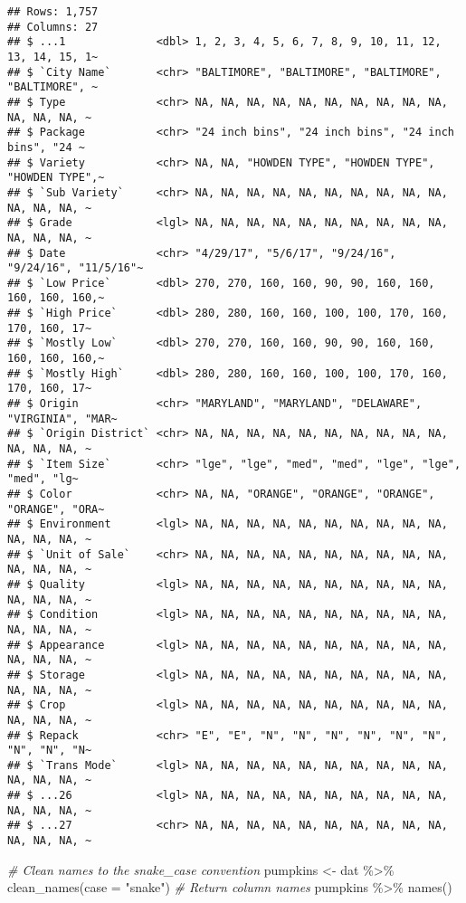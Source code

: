 \documentclass[
]{article}
\newenvironment{Shaded}{\begin{snugshade}}{\end{snugshade}}
\newcommand{\AttributeTok}[1]{\textcolor[rgb]{0.77,0.63,0.00}{#1}}
\newcommand{\CommentTok}[1]{\textcolor[rgb]{0.56,0.35,0.01}{\textit{#1}}}
\newcommand{\FunctionTok}[1]{\textcolor[rgb]{0.00,0.00,0.00}{#1}}
\newcommand{\NormalTok}[1]{#1}
\newcommand{\OtherTok}[1]{\textcolor[rgb]{0.56,0.35,0.01}{#1}}
\newcommand{\SpecialCharTok}[1]{\textcolor[rgb]{0.00,0.00,0.00}{#1}}
\newcommand{\StringTok}[1]{\textcolor[rgb]{0.31,0.60,0.02}{#1}}
\begin{document}
\begin{verbatim}
## Rows: 1,757
## Columns: 27
## $ ...1              <dbl> 1, 2, 3, 4, 5, 6, 7, 8, 9, 10, 11, 12, 13, 14, 15, 1~
## $ `City Name`       <chr> "BALTIMORE", "BALTIMORE", "BALTIMORE", "BALTIMORE", ~
## $ Type              <chr> NA, NA, NA, NA, NA, NA, NA, NA, NA, NA, NA, NA, NA, ~
## $ Package           <chr> "24 inch bins", "24 inch bins", "24 inch bins", "24 ~
## $ Variety           <chr> NA, NA, "HOWDEN TYPE", "HOWDEN TYPE", "HOWDEN TYPE",~
## $ `Sub Variety`     <chr> NA, NA, NA, NA, NA, NA, NA, NA, NA, NA, NA, NA, NA, ~
## $ Grade             <lgl> NA, NA, NA, NA, NA, NA, NA, NA, NA, NA, NA, NA, NA, ~
## $ Date              <chr> "4/29/17", "5/6/17", "9/24/16", "9/24/16", "11/5/16"~
## $ `Low Price`       <dbl> 270, 270, 160, 160, 90, 90, 160, 160, 160, 160, 160,~
## $ `High Price`      <dbl> 280, 280, 160, 160, 100, 100, 170, 160, 170, 160, 17~
## $ `Mostly Low`      <dbl> 270, 270, 160, 160, 90, 90, 160, 160, 160, 160, 160,~
## $ `Mostly High`     <dbl> 280, 280, 160, 160, 100, 100, 170, 160, 170, 160, 17~
## $ Origin            <chr> "MARYLAND", "MARYLAND", "DELAWARE", "VIRGINIA", "MAR~
## $ `Origin District` <chr> NA, NA, NA, NA, NA, NA, NA, NA, NA, NA, NA, NA, NA, ~
## $ `Item Size`       <chr> "lge", "lge", "med", "med", "lge", "lge", "med", "lg~
## $ Color             <chr> NA, NA, "ORANGE", "ORANGE", "ORANGE", "ORANGE", "ORA~
## $ Environment       <lgl> NA, NA, NA, NA, NA, NA, NA, NA, NA, NA, NA, NA, NA, ~
## $ `Unit of Sale`    <chr> NA, NA, NA, NA, NA, NA, NA, NA, NA, NA, NA, NA, NA, ~
## $ Quality           <lgl> NA, NA, NA, NA, NA, NA, NA, NA, NA, NA, NA, NA, NA, ~
## $ Condition         <lgl> NA, NA, NA, NA, NA, NA, NA, NA, NA, NA, NA, NA, NA, ~
## $ Appearance        <lgl> NA, NA, NA, NA, NA, NA, NA, NA, NA, NA, NA, NA, NA, ~
## $ Storage           <lgl> NA, NA, NA, NA, NA, NA, NA, NA, NA, NA, NA, NA, NA, ~
## $ Crop              <lgl> NA, NA, NA, NA, NA, NA, NA, NA, NA, NA, NA, NA, NA, ~
## $ Repack            <chr> "E", "E", "N", "N", "N", "N", "N", "N", "N", "N", "N~
## $ `Trans Mode`      <lgl> NA, NA, NA, NA, NA, NA, NA, NA, NA, NA, NA, NA, NA, ~
## $ ...26             <lgl> NA, NA, NA, NA, NA, NA, NA, NA, NA, NA, NA, NA, NA, ~
## $ ...27             <chr> NA, NA, NA, NA, NA, NA, NA, NA, NA, NA, NA, NA, NA, ~
\end{verbatim}

\begin{Shaded}
\begin{Highlighting}[]
\CommentTok{\# Clean names to the snake\_case convention}
\NormalTok{pumpkins }\OtherTok{\textless{}{-}}\NormalTok{ dat }\SpecialCharTok{\%\textgreater{}\%} \FunctionTok{clean\_names}\NormalTok{(}\AttributeTok{case =} \StringTok{"snake"}\NormalTok{)}
\CommentTok{\# Return column names}
\NormalTok{pumpkins }\SpecialCharTok{\%\textgreater{}\%} \FunctionTok{names}\NormalTok{()}
\end{Highlighting}
\end{Shaded}
\end{document}
